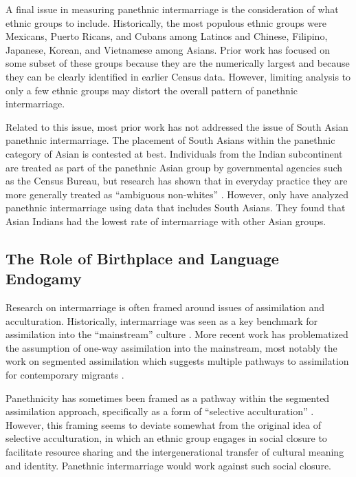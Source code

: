 \documentclass[11pt,]{article}
\begin{document}
A final issue in measuring panethnic intermarriage is the consideration of what ethnic groups to include. Historically, the most populous ethnic groups were Mexicans, Puerto Ricans, and Cubans among Latinos and Chinese, Filipino, Japanese, Korean, and Vietnamese among Asians. Prior work has focused on some subset of these groups because they are the numerically largest and because they can be clearly identified in earlier Census data. However, limiting analysis to only a few ethnic groups may distort the overall pattern of panethnic intermarriage.

Related to this issue, most prior work has not addressed the issue of South Asian panethnic intermarriage. The placement of South Asians within the panethnic category of Asian is contested at best. Individuals from the Indian subcontinent are treated as part of the panethnic Asian group by governmental agencies such as the Census Bureau, but research has shown that in everyday practice they are more generally treated as ``ambiguous non-whites'' \citep{kibria_not_1996, morning_racial_2001, schachter_finding_2014}. However, only \citet{qian_asian_2001} have analyzed panethnic intermarriage using data that includes South Asians. They found that Asian Indians had the lowest rate of intermarriage with other Asian groups.

\hypertarget{the-role-of-birthplace-and-language-endogamy}{%
\subsection{The Role of Birthplace and Language Endogamy}\label{the-role-of-birthplace-and-language-endogamy}}

Research on intermarriage is often framed around issues of assimilation and acculturation. Historically, intermarriage was seen as a key benchmark for assimilation into the ``mainstream'' culture \citep{gordon_assimilation_1964}. More recent work has problematized the assumption of one-way assimilation into the mainstream, most notably the work on segmented assimilation which suggests multiple pathways to assimilation for contemporary migrants \citep{portes_new_1993}.

Panethnicity has sometimes been framed as a pathway within the segmented assimilation approach, specifically as a form of ``selective acculturation'' \citep{bohra-mishra_intermarriage_2015}. However, this framing seems to deviate somewhat from the original idea of selective acculturation, in which an ethnic group engages in social closure to facilitate resource sharing and the intergenerational transfer of cultural meaning and identity. Panethnic intermarriage would work against such social closure.
\end{document}
